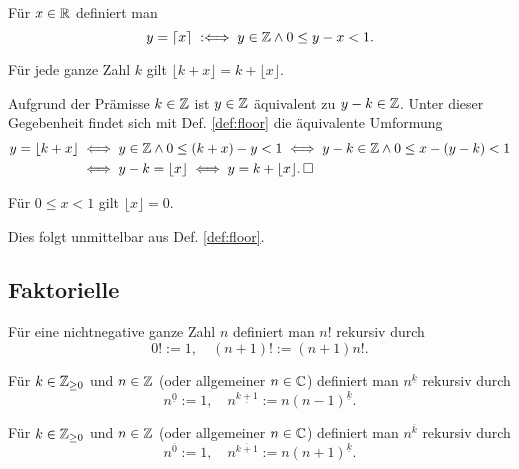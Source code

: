 \begin{Definition}[Ceilfunktion]\label{def:ceil}
Für $x\in\mathbb R$ definiert man
\[y = \lceil x\rceil\;:\Longleftrightarrow\; y\in\mathbb Z\land 0\le y-x < 1.\]
\end{Definition}

\begin{Korollar}\label{floor-add-int}
Für jede ganze Zahl $k$ gilt $\lfloor k + x\rfloor = k + \lfloor x\rfloor$.
\end{Korollar}
\begin{Beweis} Aufgrund der Prämisse $k\in\mathbb Z$ ist $y\in\mathbb Z$ äquivalent
zu $y-k\in\mathbb Z$. Unter dieser Gegebenheit findet sich mit
Def. \ref{def:floor} die äquivalente Umformung
\begin{align*}
y = \lfloor k+x\rfloor &\iff y\in\mathbb Z\land 0\le (k+x)-y < 1\iff y-k\in\mathbb Z\land 0\le x-(y-k) < 1\\
&\iff y - k = \lfloor x\rfloor \iff y = k + \lfloor x\rfloor.\,\square
\end{align*}
\end{Beweis}

\begin{Korollar}\label{floor-is-zero}
Für $0\le x < 1$ gilt $\lfloor x\rfloor = 0$.
\end{Korollar}
\begin{Beweis}
Dies folgt unmittelbar aus Def. \ref{def:floor}.\,\qedsymbol
\end{Beweis}

\newpage
\subsection{Faktorielle}

\begin{Definition}[Fakultät]%
\label{def:factorial}\newlinefirst
Für eine nichtnegative ganze Zahl $n$ definiert man $n!$ rekursiv durch
\[0! := 1,\quad (n+1)! := (n+1)n!.\]
\end{Definition}

\begin{Definition}%
\label{def:falling-factorial}\newlinefirst
Für $k\in\mathbb Z_{\ge 0}$ und $n\in\mathbb Z$ (oder allgemeiner $n\in\mathbb C$)
definiert man $n^{\underline k}$ rekursiv durch
\[n^{\underline 0} := 1,\quad n^{\underline {k+1}}:=n(n-1)^{\underline k}.\]
\end{Definition}

\begin{Definition}%
\label{def:raising-factorial}\newlinefirst
Für $k\in\mathbb Z_{\ge 0}$ und $n\in\mathbb Z$ (oder allgemeiner $n\in\mathbb C$)
definiert man $n^{\overline k}$ rekursiv durch
\[n^{\overline 0} := 1,\quad n^{\overline {k+1}}:=n(n+1)^{\underline k}.\]
\end{Definition}

